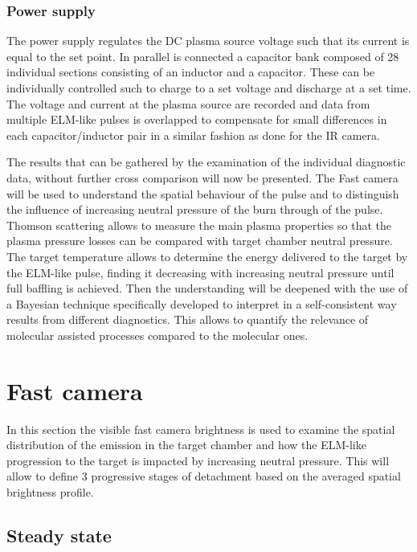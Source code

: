 \subsubsection{Power supply}\label{Power supply}
The power supply regulates the DC plasma source voltage such that its current is equal to the set point. In parallel is connected a capacitor bank composed of 28 individual sections consisting of an inductor and a capacitor. These can be individually controlled such to charge to a set voltage and discharge at a set time. The voltage and current at the plasma source are recorded and data from multiple ELM-like pulses is overlapped to compensate for small differences in each capacitor/inductor pair in a similar fashion as done for the IR camera.


The results that can be gathered by the examination of the individual diagnostic data, without further cross comparison will now be presented. The Fast camera will be used to understand the spatial behaviour of the pulse and to distinguish the influence of increasing neutral pressure of the burn through of the pulse. Thomson scattering allows to measure the main plasma properties so that the plasma pressure losses can be compared with target chamber neutral pressure. The target temperature allows to determine the energy delivered to the target by the ELM-like pulse, finding it decreasing with increasing neutral pressure until full baffling is achieved.
Then the understanding will be deepened with the use of a Bayesian technique specifically developed to interpret in a self-consistent way results from different diagnostics. This allows to quantify the relevance of molecular assisted processes compared to the molecular ones.


\section{Fast camera}\label{Fast camera}
In this section the visible fast camera brightness is used to examine the spatial distribution of the emission in the target chamber and how the ELM-like progression to the target is impacted by increasing neutral pressure. This will allow to define 3 progressive stages of detachment based on the averaged spatial brightness profile.

\subsection{Steady state}\label{Steady state}

